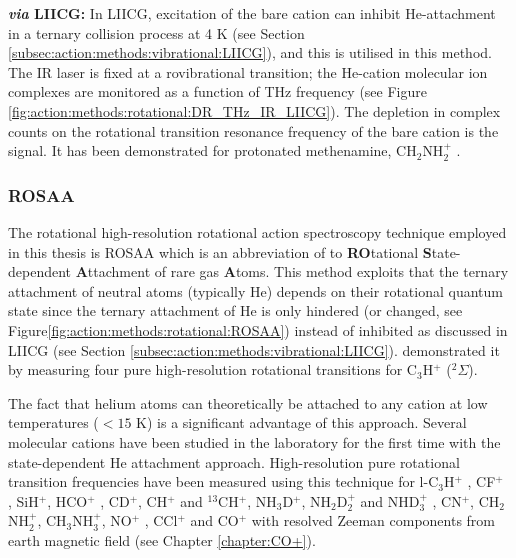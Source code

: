 \textbf{\emph{via} LIICG: } In LIICG, excitation of the bare cation can inhibit He-attachment in a ternary collision process at 4 K (see Section \ref{subsec:action:methods:vibrational:LIICG}), and this is utilised in this method. The IR laser is fixed at a rovibrational transition; the He-cation molecular ion complexes are monitored as a function of THz frequency (see Figure \ref{fig:action:methods:rotational:DR_THz_IR_LIICG}). The depletion in complex counts on the rotational transition resonance frequency of the bare cation is the signal. It has been demonstrated for protonated methenamine, CH$_2$NH$_2^+$ \cite{Markus2019}.

% 

\subsubsection{ROSAA}
\label{subsec:action:methods:rotational:ROSAA}

The rotational high-resolution rotational action spectroscopy technique
employed in this thesis is ROSAA which is an abbreviation of to
\textbf{RO}tational \textbf{S}tate-dependent \textbf{A}ttachment of rare gas
\textbf{A}toms. This method exploits that the ternary attachment of neutral
atoms (typically He) depends on their rotational quantum state since the
ternary attachment of He is only hindered (or changed, see
Figure\ref{fig:action:methods:rotational:ROSAA}) instead of inhibited as
discussed in LIICG (see Section \ref{subsec:action:methods:vibrational:LIICG}).
\citet{brunken_laboratory_2014} demonstrated it by measuring four pure
high-resolution rotational transitions for C$_3$H$^+$ ($^2\Sigma$).

The fact that helium atoms can theoretically be attached to any cation at low
temperatures ($<15$ K) is a significant advantage of this approach. Several
molecular cations have been studied in the laboratory for the first time with
the state-dependent He attachment approach. High-resolution pure rotational
transition frequencies have been measured using this technique for l-C$_3$H$^+$
\cite{brunken_laboratory_2014}, CF$^+$ \cite{stoffels_laboratory_2016},
SiH$^+$\cite{domenech2017}, HCO$^+$ \cite{salomon_double_2019},
CD$^+$\cite{Brunken2017}, CH$^+$ and $^{13}$CH$^+$\cite{domenech_first_2018},
NH$_3$D$^+$\cite{stoffels_laboratory_2016, domenech_accurate_2018},
NH$_2$D$_2^+$ and NHD$_3^+$ \cite{domenech_accurate_2018},
CN$^+$\cite{thorwirth_pure_2019}, CH$_2$NH$_2^+$\cite{Markus2019},
CH$_3$NH$_3^+$\cite{schmid_rotational_2022}, NO$^+$
\cite{asvany_fundamental_2021}, CCl$^+$\cite{asvany_pure_2021} and CO$^+$ with
resolved Zeeman components from earth magnetic field
\cite{marimuthu_zeeman_2022, Brunken2017} (see Chapter \ref{chapter:CO+}).\\

